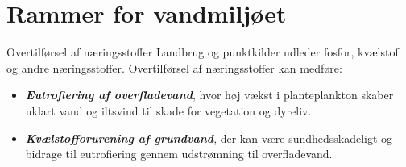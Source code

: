 \section{Rammer for vandmiljøet}

\begin{frame}{Overtilførsel af næringsstoffer}
  Landbrug og punktkilder udleder fosfor, kvælstof og andre næringsstoffer. Overtilførsel af næringsstoffer kan medføre:
  \begin{itemize}
    \item \textbf{\textit{Eutrofiering af overfladevand}}, hvor høj vækst i planteplankton skaber uklart vand og iltsvind til skade for vegetation og dyreliv.
    \item \textbf{\textit{Kvælstofforurening af grundvand}}, der kan være sundhedsskadeligt og bidrage til eutrofiering gennem udstrømning til overfladevand.
  \end{itemize}
\end{frame}

